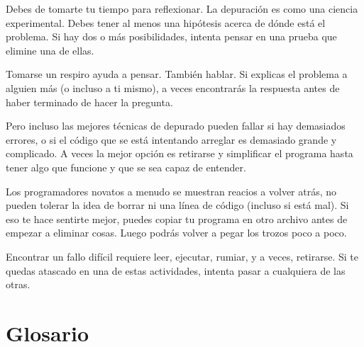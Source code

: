 
Debes de tomarte tu tiempo para reflexionar. La depuración es como una
ciencia experimental. Debes tener al menos una hipótesis acerca
de dónde está el problema. Si hay dos o más posibilidades, intenta
pensar en una prueba que elimine una de ellas.

Tomarse un respiro ayuda a pensar. También hablar.
Si explicas el problema a alguien más (o incluso a ti mismo),
a veces encontrarás la respuesta antes de haber terminado de hacer la pregunta.

Pero incluso las mejores técnicas de depurado pueden fallar si hay demasiados
errores, o si el código que se está intentando arreglar es demasiado grande
y complicado. A veces la mejor opción es retirarse y simplificar el
programa hasta tener algo que funcione y que se sea
capaz de entender.

Los programadores novatos a menudo se muestran reacios a volver atrás,
no pueden tolerar la idea de borrar ni una línea de código (incluso si está mal).
Si eso te hace sentirte mejor, puedes copiar tu programa en otro archivo
antes de empezar a eliminar cosas. Luego podrás volver a pegar los
trozos poco a poco.

Encontrar un fallo difícil requiere leer, ejecutar, rumiar, y
a veces, retirarse. Si te quedas atascado en una de estas actividades,
intenta pasar a cualquiera de las otras.


\section{Glosario}

